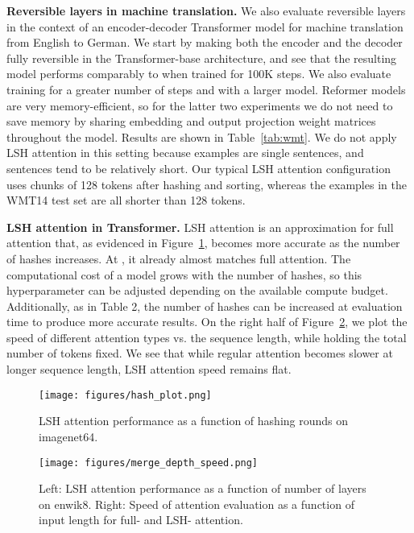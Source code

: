 \documentclass{article} \usepackage{iclr2020_conference,times}
\renewcommand{\paragraph}[1]{\textbf{#1}}
\begin{document}
\paragraph{Reversible layers in machine translation.}
We also evaluate reversible layers in the context of an encoder-decoder Transformer model for machine translation from English to German. We start by making both the encoder and the decoder fully reversible in the Transformer-base architecture, and see that the resulting model performs comparably to \citet{transformer} when trained for 100K steps. We also evaluate training for a greater number of steps and with a larger model. Reformer models are very memory-efficient, so for the latter two experiments we do not need to save memory by sharing embedding and output projection weight matrices throughout the model. Results are shown in Table~\ref{tab:wmt}. We do not apply LSH attention in this setting because examples are single sentences, and sentences tend to be relatively short. Our typical LSH attention configuration uses chunks of 128 tokens after hashing and sorting, whereas the examples in the WMT14 test set are all shorter than 128 tokens.

\paragraph{LSH attention in Transformer.} \label{sec:exp_lsh}
LSH attention is an approximation for full attention that, as evidenced in Figure~\ref{fig:hash-curves}, becomes more accurate as the number of hashes increases. At , it already almost matches full attention. The computational cost of a model grows with the number of hashes, so this hyperparameter can be adjusted depending on the available compute budget. Additionally, as in Table 2, the number of hashes can be increased at evaluation time to produce more accurate results.
On the right half of Figure~\ref{fig:layer-curves}, we plot the speed of different attention types vs. the sequence length, while holding the total number of tokens fixed. We see that while regular attention becomes slower at longer sequence length, LSH attention speed remains flat.


\begin{figure}[!t]
    \centering
    \texttt{[image: figures/hash\_plot.png]}
    \caption{LSH attention performance as a function of hashing rounds on imagenet64.}
    \label{fig:hash-curves}
\end{figure}

\begin{figure}[!t]
    \centering
    \texttt{[image: figures/merge\_depth\_speed.png]}
    \caption{Left: LSH attention performance as a function of number of layers on enwik8. 
    Right: Speed of attention evaluation as a function of input length for full- and LSH- attention.}
    \label{fig:layer-curves}
\end{figure}
\end{document}
